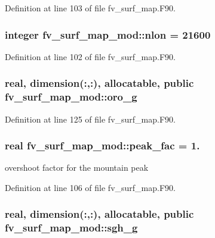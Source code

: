 Definition at line 103 of file fv\-\_\-surf\-\_\-map.\-F90.

\subsubsection[{nlon}]{\setlength{\rightskip}{0pt plus 5cm}integer fv\-\_\-surf\-\_\-map\-\_\-mod\-::nlon = 21600\hspace{0.3cm}{\ttfamily [private]}}\label{classfv__surf__map__mod_a72b1ec87d6827bd07191488811b6f129}


Definition at line 102 of file fv\-\_\-surf\-\_\-map.\-F90.

\subsubsection[{oro\-\_\-g}]{\setlength{\rightskip}{0pt plus 5cm}real, dimension(\-:,\-:), allocatable, public fv\-\_\-surf\-\_\-map\-\_\-mod\-::oro\-\_\-g}\label{classfv__surf__map__mod_a89960949339245bd7440d1735b7b6fa2}


Definition at line 125 of file fv\-\_\-surf\-\_\-map.\-F90.

\subsubsection[{peak\-\_\-fac}]{\setlength{\rightskip}{0pt plus 5cm}real fv\-\_\-surf\-\_\-map\-\_\-mod\-::peak\-\_\-fac = 1.\hspace{0.3cm}{\ttfamily [private]}}\label{classfv__surf__map__mod_a66780e7d69cb8f5776ae7e79b7301e92}


overshoot factor for the mountain peak 



Definition at line 106 of file fv\-\_\-surf\-\_\-map.\-F90.

\subsubsection[{sgh\-\_\-g}]{\setlength{\rightskip}{0pt plus 5cm}real, dimension(\-:,\-:), allocatable, public fv\-\_\-surf\-\_\-map\-\_\-mod\-::sgh\-\_\-g}\label{classfv__surf__map__mod_a1f6c2740389c832c7b613cd7f0d5a407}


